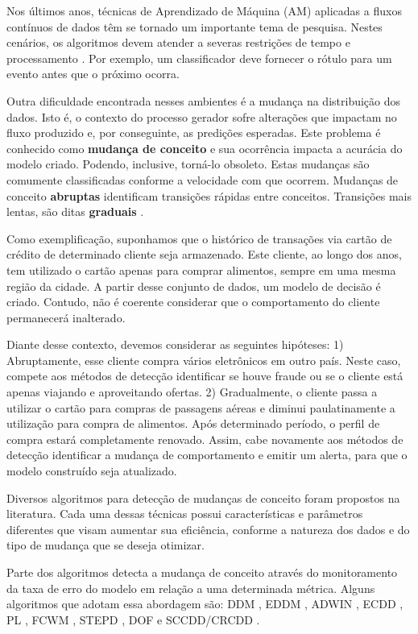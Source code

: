 \documentclass[qual, classic, a4paper]{ufbathesis}
\begin{document}
Nos últimos anos, técnicas de Aprendizado de Máquina (AM) aplicadas a fluxos contínuos de dados têm se tornado um importante tema de pesquisa.
Nestes cenários, os algoritmos devem atender a severas restrições de tempo e processamento \cite{Bifet:2009:ALM:1656274.1656287}.
Por exemplo, um classificador deve fornecer o rótulo para um evento antes que o próximo ocorra. 

Outra dificuldade encontrada nesses ambientes é a mudança na distribuição dos dados. 
Isto é, o contexto do processo gerador sofre alterações que impactam no fluxo produzido e, por conseguinte, as predições esperadas.
Este problema é conhecido como \textbf{mudança de conceito} \cite{Gama:2010:KDD:1855075} e sua ocorrência impacta a acurácia do modelo criado.
Podendo, inclusive, torná-lo obsoleto.
Estas mudanças são comumente classificadas conforme a velocidade com que ocorrem.
Mudanças de conceito \textbf{abruptas} identificam transições rápidas entre conceitos. 
Transições mais lentas, são ditas \textbf{graduais} \cite{Gama:2014:SCD:2597757.2523813}.

Como exemplificação, suponhamos que o histórico de transações via cartão de crédito de determinado cliente seja armazenado.
Este cliente, ao longo dos anos, tem utilizado o cartão apenas para comprar alimentos, sempre em uma mesma região da cidade.
A partir desse conjunto de dados, um modelo de decisão é criado.
Contudo, não é coerente considerar que o comportamento do cliente permanecerá inalterado.

Diante desse contexto, devemos considerar as seguintes hipóteses:
1) Abruptamente, esse cliente compra vários eletrônicos em outro país.
Neste caso, compete aos métodos de detecção identificar se houve fraude ou se o cliente está apenas viajando e aproveitando ofertas.
2) Gradualmente, o cliente passa a utilizar o cartão para compras de passagens aéreas e diminui paulatinamente a utilização para compra de alimentos.
Após determinado período, o perfil de compra estará completamente renovado.
Assim, cabe novamente aos métodos de detecção identificar a mudança de comportamento e emitir um alerta, 
para que o modelo construído seja atualizado.

Diversos algoritmos para detecção de mudanças de conceito foram propostos na literatura.
Cada uma dessas técnicas possui características e parâmetros diferentes que visam aumentar sua eficiência, 
conforme a natureza dos dados e do tipo de mudança que se deseja otimizar.

Parte dos algoritmos detecta a mudança de conceito através do monitoramento da taxa de erro do modelo em relação a uma determinada métrica.
Alguns algoritmos que adotam essa abordagem são: 
DDM \cite{GamaMCR04}, EDDM \cite{EDDM},  
ADWIN \cite{BifetG07}, ECDD \cite{Ross:2012:EWM:2076039.2076307}, 
PL \cite{Bach:PL:2008}, FCWM \cite{FCWM}, STEPD \cite{STEPD}, DOF \cite{Sobhani:2011:NDD:2045295.2045309} e 
SCCDD/CRCDD \cite{daCosta:2016:UDS:2956219.2956389}.
\end{document}
